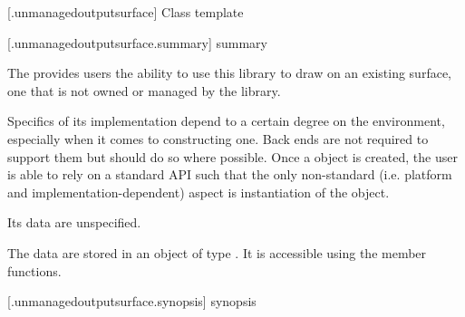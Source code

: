  [\iotwod.unmanagedoutputsurface] {Class template }

 [\iotwod.unmanagedoutputsurface.summary] { summary}

\pnum
{}%
The  provides users the ability to use this library to draw on an existing surface, one that is not owned or managed by the library.

\pnum
Specifics of its implementation depend to a certain degree on the environment, especially when it comes to constructing one. Back ends are not required to support them but should do so where possible. Once a  object is created, the user is able to rely on a standard API such that the only non-standard (i.e. platform and implementation-dependent) aspect is instantiation of the object.

\pnum
Its data are unspecified.

\pnum
The data are stored in an object of type . It is accessible using the  member functions.

 [\iotwod.unmanagedoutputsurface.synopsis] { synopsis}

